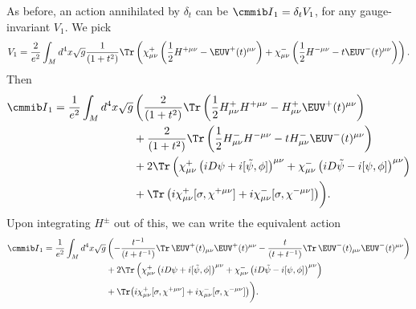 As before, an action annihilated by $\delta_t$ can be ${\cmmib
I}_1=\delta_t V_1$, for any gauge-invariant $V_1$.  We pick
\setcounter{equation}{42}
\begin{equation}\label{eq:usefuld}
V_1={2\over e^2}\int_Md^4x \sqrt g{1\over
(1+t^2)}\Tr\left(\chi^+_{\mu\nu}\left({1\over
2}H^{+\mu\nu}-\EUV^+(t)^{\mu\nu}\right)
+\chi^-_{\mu\nu}\left({1\over
2}H^{-\mu\nu}-t\EUV^-(t)^{\mu\nu}\right)\right).
\end{equation}
 Then
\setcounter{equation}{43}
\begin{equation}\label{eq:usefuldud}
\begin{aligned}{{{\cmmib I}}}_1= {1\over e^2}\int_Md^4x
\sqrt g&\left({2\over (1+t^2)}\Tr\left({1\over
2}H^+_{\mu\nu}H^{+\mu\nu}-H^+_{\mu\nu}\EUV^+(t)^{\mu\nu}\right)\right.\\
& + {2\over (1+t^2)}\Tr\left({1\over
2}H^-_{\mu\nu}H^{-\mu\nu}-tH^-_{\mu\nu}\EUV^-(t)^{\mu\nu}\right)\\
&+
2\Tr\left(\chi^+_{\mu\nu}\left(iD\psi+i[\tilde\psi,\phi]\right)^{\mu\nu}
+\chi^-_{\mu\nu}\left(iD\tilde\psi-i[\psi,\phi]\right)^{\mu\nu}\right)\\
&+\Tr\left(i\chi^+_{\mu\nu}[\sigma,\chi^{+\mu\nu}]+
i\chi^-_{\mu\nu}[\sigma,\chi^{-\mu\nu}] \right)\biggr).\\\end{aligned}
\end{equation}
 Upon
integrating $H^{\pm}$ out of this, we can write the equivalent
action %
\setcounter{equation}{44}
\begin{equation}\label{eq:usefuldudd}
\begin{aligned}{{\cmmib I}}_1= {1\over
e^2}\int_Md^4x \sqrt g&\left(-{t^{-1}\over
(t+t^{-1})}\Tr\,\EUV^+(t)_{\mu\nu}\EUV^+(t)^{\mu\nu}-{t\over
(t+t^{-1})}\Tr\,\EUV^-(t)_{\mu\nu}\EUV^-(t)^{\mu\nu}\right)\\ &+
2\Tr\left(\chi^+_{\mu\nu}\left(iD\psi+i[\tilde\psi,\phi]\right)^{\mu\nu}
+\chi^-_{\mu\nu}\left(iD\tilde\psi-i[\psi,\phi]\right)^{\mu\nu}\right)\\
&+\Tr\bigl(i\chi^+_{\mu\nu}[\sigma,\chi^{+\mu\nu}]+
i\chi^-_{\mu\nu}[\sigma,\chi^{-\mu\nu}] \bigr)\biggr).\\\end{aligned}
\end{equation}

